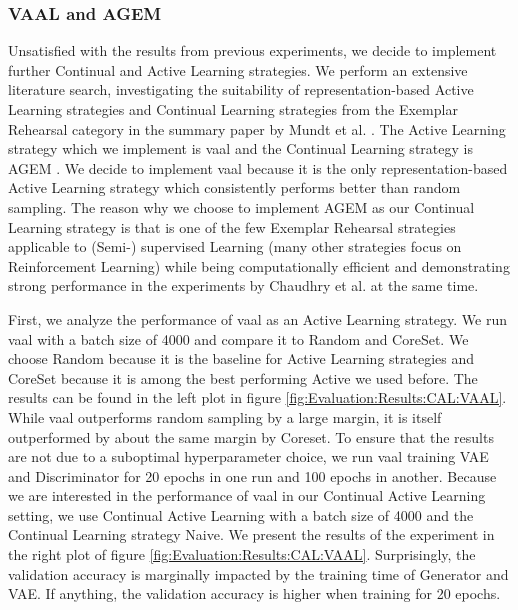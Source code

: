 \subsubsection{VAAL and AGEM}
\label{sec:Evaluation:Results:CAL:VAAL_AGEM}
Unsatisfied with the results from previous experiments, we decide to implement further Continual and Active Learning strategies. We perform an extensive literature search, investigating the suitability of representation-based Active Learning strategies and Continual Learning
strategies from the Exemplar Rehearsal category in the summary paper by Mundt et al. \cite{mundt2020wholistic}. The Active Learning strategy which we implement is \gls{vaal} \cite{sinha2019variational} and the Continual Learning strategy is AGEM \cite{chaudhry2019continual}. We decide
to implement \gls{vaal} because it is the only representation-based Active Learning strategy which consistently performs better than random sampling. The reason why we choose to implement AGEM as our Continual Learning strategy is that is one of the few Exemplar Rehearsal strategies
applicable to (Semi-) supervised Learning (many other strategies focus on Reinforcement Learning) while being computationally efficient and demonstrating strong performance in the experiments by Chaudhry et al. \cite{chaudhry2019continual} at the same time. \par
First, we analyze the performance of \gls{vaal} as an Active Learning strategy. We run \gls{vaal} with a batch size of 4000 and compare it to Random and CoreSet. We choose Random because it is the baseline for Active Learning strategies and CoreSet because it is among the best performing Active
we used before. The results can be found in the left plot in figure \ref{fig:Evaluation:Results:CAL:VAAL}. While \gls{vaal} outperforms random sampling by a large margin, it is itself outperformed by about the same margin by Coreset. To ensure that the results are not due to a
suboptimal hyperparameter choice, we run \gls{vaal} training VAE and Discriminator for 20 epochs in one run and 100 epochs in another. Because we are interested in the performance of \gls{vaal} in our Continual Active Learning setting, we use Continual Active Learning with a batch size of 4000
and the Continual Learning strategy Naive. We present the results of the experiment in the right plot of figure \ref{fig:Evaluation:Results:CAL:VAAL}. Surprisingly, the validation accuracy is marginally impacted by the training time of Generator and VAE. If anything, the validation
accuracy is higher when training for 20 epochs. \par

